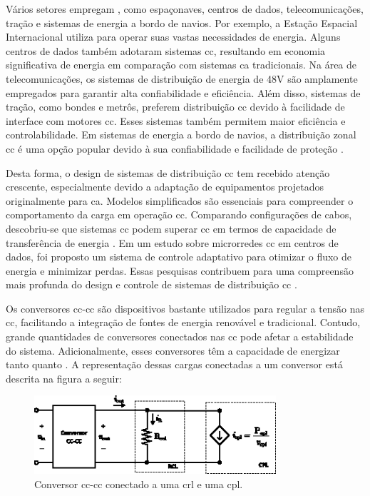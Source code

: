 Vários setores empregam , como espaçonaves, centros de dados, telecomunicações, tração e sistemas de energia a bordo de navios. Por exemplo, a Estação Espacial Internacional utiliza  para operar suas vastas necessidades de energia. Alguns centros de dados também adotaram sistemas \acrshort{cc}, resultando em economia significativa de energia em comparação com sistemas \acrshort{ca} tradicionais. Na área de telecomunicações, os sistemas de distribuição de energia de 48V são amplamente empregados para garantir alta confiabilidade e eficiência. Além disso, sistemas de tração, como bondes e metrôs, preferem distribuição \acrshort{cc} devido à facilidade de interface com motores \acrshort{cc}. Esses sistemas também permitem maior eficiência e controlabilidade. Em sistemas de energia a bordo de navios, a distribuição zonal \acrshort{cc} é uma opção popular devido à sua confiabilidade e facilidade de proteção \citep{Elsayed2015}.

Desta forma, o design de sistemas de distribuição \acrshort{cc} tem recebido atenção crescente, especialmente devido a adaptação de equipamentos projetados originalmente para \acrshort{ca}. Modelos simplificados são essenciais para compreender o comportamento da carga em operação \acrshort{cc}. Comparando configurações de cabos, descobriu-se que sistemas \acrshort{cc} podem superar \acrshort{cc} em termos de capacidade de transferência de energia \citep{Salomonsson2007}. Em um estudo sobre microrredes \acrshort{cc} em centros de dados, foi proposto um sistema de controle adaptativo para otimizar o fluxo de energia e minimizar perdas. Essas pesquisas contribuem para uma compreensão mais profunda do design e controle de sistemas de distribuição \acrshort{cc} \citep{Salomonsson2008}.

Os conversores \acrshort{cc}-\acrshort{cc} são dispositivos bastante utilizados para regular a tensão nas  \acrshort{cc}, facilitando a integração de fontes de energia renovável e tradicional. Contudo, grande quantidades de conversores conectados nas  \acrshort{cc} pode afetar a estabilidade do sistema. Adicionalmente, esses conversores têm a capacidade de energizar tanto  quanto . A representação dessas cargas conectadas a um conversor está descrita na figura a seguir:

\begin{figure}[H]
  \centering
  \includegraphics[width=0.80\textwidth]{figuras/cpl_circuit.eps}
  \caption{Conversor \acrshort{cc}-\acrshort{cc} conectado a uma \acrshort{crl} e uma \acrshort{cpl}.}
  \label{fig:cpl_circuit}
\end{figure}

